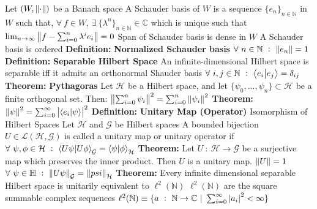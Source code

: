 \documentclass[14pt]{extarticle}
\def\Definition{{\color{blue} \textbf{Definition:} }}
\def\Theorem{{\color{red} \textbf{Theorem:} }}
\begin{document}
\begin{outline}
			\2	Let $(W,\norm{\cdot})$ be a Banach space
			\2	A Schauder basis of $W$ is a sequence $\{e_n\}_{n \in \mathbb{N}}$ in
					$W$ such that, $\forall~f \in W$, $\exists~\{\lambda^n\}_{n \in \mathbb{N}} \in \mathbb{C}$
					which is unique such that
			\2	$\lim_{n \rightarrow \infty}\norm{f - \sum_{i=0}^n \lambda^ie_i} = 0$
			\2	Span of Schauder basis is dense in $W$
			\2	A Schauder basis is ordered
			\2	\Definition \textbf{Normalized Schauder basis}
				\3	$\forall~n \in \mathbb{N}~:~\norm{e_n} = 1$
		\1	\Definition \textbf{Separable Hilbert Space}
			\2	An infinite-dimensional Hilbert space is separable iff it
					admits an orthonormal Shauder basis
			\2	$\forall~i,j \in \mathbb{N}~:~\braket{e_i}{e_j} = \delta_{ij}$
		\1	\Theorem \textbf{Pythagoras}
			\2	Let $\mathcal{H}$ be a Hilbert space, and let $\{\psi_0,...,\psi_n\} \subset \mathcal{H}$
					be a finite orthogonal set.  Then:
			\2	$\norm{\sum_{i=0}^n \psi_i}^2 = \sum_{i=0}^n \norm{\psi_i}^2$
		\1	\Theorem $\norm{\psi}^2 = \sum_{i=0}^{\infty} \abs{\braket{e_i}{\psi}}^2$
		\1	\Definition \textbf{Unitary Map (Operator)}
			\2	Isomorphism of Hilbert Spaces
			\2	Let $\mathcal{H}$ and $\mathcal{G}$ be Hilbert spaces
			\2	A bounded bijection $U \in \mathcal{L}(\mathcal{H},\mathcal{G})$
					is called a unitary map or unitary operator if
				\3	$\forall~\psi,\phi \in \mathcal{H}~:~\braket{U\psi}{U\phi}_{\mathcal{G}} =
						\braket{\psi}{\phi}_{\mathcal{H}}$
		\1	\Theorem Let $U~:~\mathcal{H} \rightarrow \mathcal{G}$ be a surjective
				map which preserves the inner product.  Then $U$ is a unitary map.
			\2	$\norm{U} = 1$
			\2	$\forall~\psi \in \mathbb{H}~:~\norm{U \psi}_{\mathcal{G}} = \norm{psi}_{\mathcal{H}}$
		\1	\Theorem Every infinite dimensional separable Hilbert space is unitarily
				equivalent to $\ell^2(\mathbb{N})$
				\2	$\ell^2(\mathbb{N})$ are the square summable complex sequences
				\2	$\ell^2(\mathbb{N}) \equiv \{a~:~\mathbb{N} \rightarrow \mathbb{C}~|~
						\sum_{i=0}^{\infty} \abs{a_i}^2 < \infty\}$
	

\end{outline}
\end{document}
